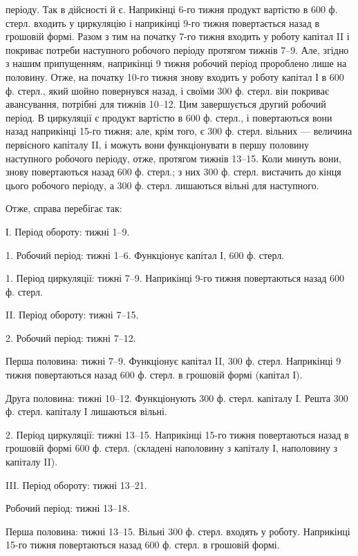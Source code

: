 \parcont{}  %
періоду. Так в дійсності й є. Наприкінці 6-го тижня продукт вартістю
в 600 ф. стерл. входить у циркуляцію і наприкінці 9-го тижня повертається
назад в грошовій формі. Разом з тим на початку 7-го тижня
входить у роботу капітал II і покриває потреби наступного робочого
періоду протягом тижнів 7--9. Але, згідно з нашим припущенням, наприкінці
9 тижня робочий період пророблено лише на половину. Отже, на
початку 10-го тижня знову входить у роботу капітал І в 600 ф. стерл.,
який шойно повернувся назад, і своїми 300 ф. стерл. він покриває авансування,
потрібні для тижнів 10--12. Цим завершується другий робочий
період. В циркуляції є продукт вартістю в 600 ф. стерл., і повертаються
вони назад наприкінці 15-го тижня; але, крім того, є 300 ф. стерл.
вільних — величина первісного капіталу II, і можуть вони функціонувати
в першу половину наступного робочого періоду, отже, протягом тижнів
13--15. Коли минуть вони, знову повертаються назад 600 ф. стерл.;
з них 300 ф. стерл. вистачить до кінця цього робочого періоду, а
300 ф. стерл. лишаються вільні для наступного.

Отже, справа перебігає так:

І. Період обороту: тижні 1--9.

1. Робочий період: тижні 1--6. Функціонує капітал І, 600 ф. стерл.

1. Період циркуляції: тижні 7--9. Наприкінці 9-го тижня повертаються
назад 600 ф. стерл.

II. Період обороту: тижні 7--15.

2. Робочий період: тижні 7--12.

Перша половина: тижні 7--9. Функціонує капітал II, 300 ф. стерл.
Наприкінці 9 тижня повертаються назад 600 ф. стерл. в грошовій формі
(капітал І).

Друга половина: тижні 10--12. Функціонують 300 ф. стерл. капіталу
І. Решта 300 ф. стерл. капіталу І лишаються вільні.

2. Період циркуляції: тижні 13--15. Наприкінці 15-го тижня повертаються
назад в грошовій формі 600 ф. стерл. (складені наполовину
з капіталу І, наполовину з капіталу II).

III. Період обороту: тижні 13--21.

Робочий період: тижні 13--18.

Перша половина: тижні 13--15. Вільні 300 ф. стерл. входять у
роботу. Наприкінці 15-го тижня повертаються назад 600 ф. стерл. в грошовій
формі.

